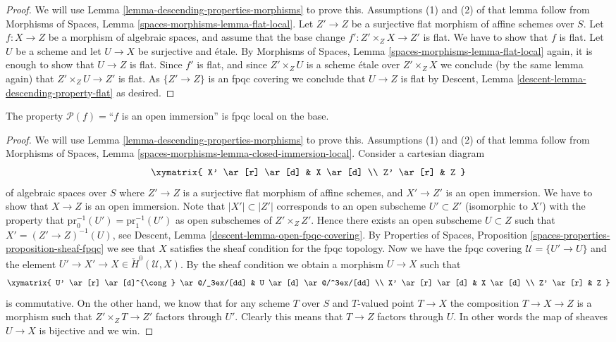 \begin{proof}
We will use
Lemma \ref{lemma-descending-properties-morphisms}
to prove this. Assumptions (1) and (2) of that lemma follow from
Morphisms of Spaces,
Lemma \ref{spaces-morphisms-lemma-flat-local}.
Let $Z' \to Z$ be a surjective flat morphism of affine schemes over $S$.
Let $f : X \to Z$ be a morphism of algebraic spaces, and assume
that the base change $f' : Z' \times_Z X \to Z'$ is flat.
We have to show that $f$ is flat. Let $U$ be a scheme
and let $U \to X$ be surjective and \'etale. By
Morphisms of Spaces,
Lemma \ref{spaces-morphisms-lemma-flat-local}
again, it is enough to show that $U \to Z$ is flat.
Since $f'$ is flat, and since $Z' \times_Z U$ is a
scheme \'etale over $Z' \times_Z X$ we conclude (by the same lemma again) that
$Z' \times_Z U \to Z'$ is flat.
As $\{Z' \to Z\}$ is an fpqc covering we conclude that
$U \to Z$ is flat by
Descent, Lemma \ref{descent-lemma-descending-property-flat}
as desired.
\end{proof}

\begin{lemma}
\label{lemma-descending-property-open-immersion}
The property $\mathcal{P}(f) =$``$f$ is an open immersion''
is fpqc local on the base.
\end{lemma}

\begin{proof}
We will use
Lemma \ref{lemma-descending-properties-morphisms}
to prove this. Assumptions (1) and (2) of that lemma follow from
Morphisms of Spaces,
Lemma \ref{spaces-morphisms-lemma-closed-immersion-local}.
Consider a cartesian diagram
$$
\xymatrix{
X' \ar[r] \ar[d] & X \ar[d] \\
Z' \ar[r] & Z
}
$$
of algebraic spaces over $S$
where $Z' \to Z$ is a surjective flat morphism of affine schemes,
and $X' \to Z'$ is an open immersion. We have to show that $X \to Z$
is an open immersion. Note that $|X'| \subset |Z'|$ corresponds to an
open subscheme $U' \subset Z'$ (isomorphic to $X'$)
with the property that $\text{pr}_0^{-1}(U') = \text{pr}_1^{-1}(U')$
as open subschemes of $Z' \times_Z Z'$. Hence there exists an open
subscheme $U \subset Z$ such that $X' = (Z' \to Z)^{-1}(U)$, see
Descent, Lemma \ref{descent-lemma-open-fpqc-covering}.
By Properties of Spaces,
Proposition \ref{spaces-properties-proposition-sheaf-fpqc}
we see that $X$ satisfies the sheaf condition for the fpqc topology.
Now we have the fpqc covering $\mathcal{U} = \{U' \to U\}$
and the element $U' \to X' \to X \in \check{H}^0(\mathcal{U}, X)$.
By the sheaf condition we obtain a morphism $U \to X$ such that
$$
\xymatrix{
U' \ar[r] \ar[d]^{\cong} \ar@/_3ex/[dd] & U \ar[d] \ar@/^3ex/[dd] \\
X' \ar[r] \ar[d] & X \ar[d] \\
Z' \ar[r] & Z
}
$$
is commutative. On the other hand, we know that for any scheme $T$ over $S$
and $T$-valued point $T \to X$ the composition $T \to X \to Z$ is a
morphism such that $Z' \times_Z T \to Z'$ factors through $U'$. Clearly
this means that $T \to Z$ factors through $U$. In other words the map
of sheaves $U \to X$ is bijective and we win.
\end{proof}

